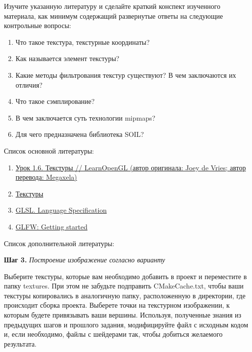 \documentclass[a4paper,12pt]{article}
\begin{document}
    Изучите указанную литературу и сделайте краткий конспект изученного материала, как минимум содержащий развернутые ответы на следующие контрольные вопросы:

    \begin{enumerate}
        \item 
        Что такое текстура, текстурные координаты?
        \item 
        Как называется элемент текстуры?
        \item 
        Какие методы фильтрования текстур существуют? В чем заключаются их отличия?
        \item 
        Что такое сэмплирование?
        \item 
        В чем заключается суть технологии mipmaps?
        \item 
        Для чего предназначена библиотека SOIL?
    \end{enumerate}

    Список основной литературы:
    \begin{enumerate}
        \item \href{https://habr.com/ru/post/315294/}{Урок 1.6. Текстуры // LearnOpenGL (автор оригинала: Joey de Vries; автор перевода: Megaxela)}
        \item \href{Ravesli.com https://ravesli.com/urok-6-tekstury-v-opengl/}{Текстуры}
        \item \href{https://www.khronos.org/registry/OpenGL/specs/gl/}{GLSL. Language Specification}
        \item \href{https://www.glfw.org/docs/latest/quick.html}{GLFW: Getting started}
    \end{enumerate}

    Список дополнительной литературы:
    
    \textbf{Шаг 3.} \textit{Построение изображение согласно варианту}
    
    Выберите текстуры, которые вам необходимо добавить в проект и переместите в папку \textquotedbl textures\textquotedbl. При этом не забудьте подправить \textquotedbl CMakeCache.txt\textquotedbl, чтобы ваши текстуры копировались в аналогичную папку, расположенную в директории, где происходит сборка проекта. Выберете точки на текстурном изображении, к которым будете привязывать ваши вершины. Используя, полученные знания из предыдущих шагов и прошлого задания, модифицируйте файл с исходным кодом и, если необходимо, файлы с шейдерами так, чтобы добиться желаемого результата.
    
\end{document}
